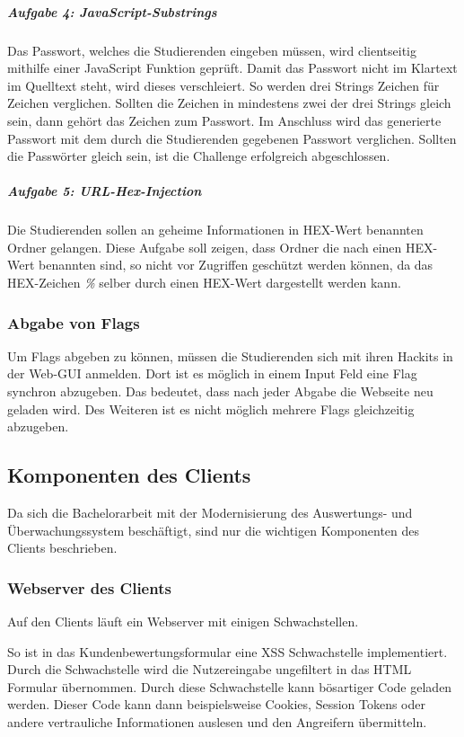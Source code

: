 \subparagraph{Aufgabe 4: JavaScript-Substrings}\label{subpara:Aufgabe_4_JavaScript-Substrings}
Das Passwort, welches die Studierenden eingeben müssen, wird clientseitig mithilfe einer JavaScript Funktion geprüft. Damit das Passwort nicht im Klartext im Quelltext steht, wird dieses verschleiert. So werden drei Strings Zeichen für Zeichen verglichen. Sollten die Zeichen in mindestens zwei der drei Strings gleich sein, dann gehört das Zeichen zum Passwort. Im Anschluss wird das generierte Passwort mit dem durch die Studierenden gegebenen Passwort verglichen. Sollten die Passwörter gleich sein, ist die Challenge erfolgreich abgeschlossen.

\subparagraph{Aufgabe 5: URL-Hex-Injection}\label{subpara:Aufgabe_5_URL-Hex-Injection}
Die Studierenden sollen an geheime Informationen in HEX-Wert benannten Ordner gelangen. Diese Aufgabe soll zeigen, dass Ordner die nach einen HEX-Wert benannten sind, so nicht vor Zugriffen geschützt werden können, da das HEX-Zeichen \textit{\%} selber durch einen HEX-Wert dargestellt werden kann.

\subsubsection{Abgabe von Flags}\label{subsubsec:Abgabe_von_Flags}
Um Flags abgeben zu können, müssen die Studierenden sich mit ihren Hackits in der Web-GUI anmelden. Dort ist es möglich in einem Input Feld eine Flag synchron abzugeben. Das bedeutet, dass nach jeder Abgabe die Webseite neu geladen wird. Des Weiteren ist es nicht möglich mehrere Flags gleichzeitig abzugeben.

\subsection{Komponenten des Clients}\label{subsec:Komponente_des_Clients}
Da sich die Bachelorarbeit mit der Modernisierung des Auswertungs- und Überwachungssystem beschäftigt, sind nur die wichtigen Komponenten des Clients beschrieben.

\subsubsection{Webserver des Clients}\label{subsubsec:Webserver_des_Clients}
Auf den Clients läuft ein Webserver mit einigen Schwachstellen. 

So ist in das Kundenbewertungsformular eine XSS Schwachstelle implementiert. Durch die Schwachstelle wird die Nutzereingabe ungefiltert in das HTML Formular übernommen. Durch diese Schwachstelle kann bösartiger Code geladen werden. Dieser Code kann dann beispielsweise Cookies, Session Tokens oder andere vertrauliche Informationen auslesen und den Angreifern übermitteln. 

